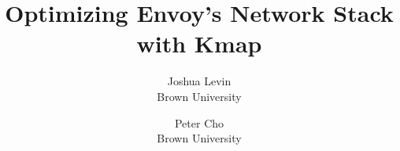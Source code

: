 \usepackage{balance}

\newcommand{\needscitation}[1]{\textbf{\color{blue} NEEDS CITATION}}

\newcommand{\josh}[1]{\textbf{\color{red} Josh's Comment :: #1 }}
\newcommand{\peter}[1]{\textbf{\color{orange} Peter's Comment :: #1 }}

\newcommand{\sysname}{Kmap\xspace}

%
%



\date{}


\title{Optimizing Envoy's Network Stack with \sysname}

 \author{
 {\rm Joshua Levin}\\
 Brown University
 \and
 {\rm Peter Cho}\\
 Brown University
 }

\maketitle

\begin{abstract}

\end{abstract}
















